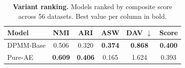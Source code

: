 \begin{table}[!htbp]
\centering
\caption{\textbf{Variant ranking.} Models ranked by composite score across 56 datasets. Best value per column in bold.}
\label{tab:dpmm_variant_ranking}
\begin{tabular}{lccccc}
\toprule
Model & NMI & ARI & ASW & DAV $\downarrow$ & Score \\
\midrule
DPMM-Base & 0.506 & 0.320 & \textbf{0.374} & \textbf{0.868} & \textbf{0.400} \\
Pure-AE & \textbf{0.609} & \textbf{0.406} & 0.165 & 1.624 & 0.393 \\
\bottomrule
\end{tabular}
\end{table}
